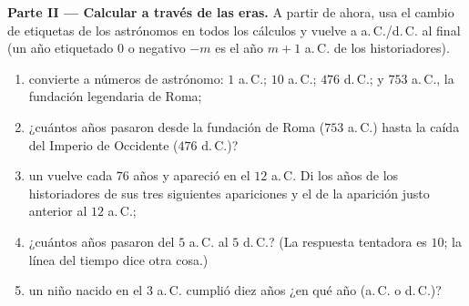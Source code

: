 \begin{problem}
\medskip
\noindent\textbf{Parte II --- Calcular a través de las eras.}
A partir de ahora, usa el cambio de etiquetas de los astrónomos en todos los
cálculos y vuelve a a.\,C./d.\,C. al final (un año etiquetado
$0$ o negativo $-m$ es el año $m + 1$ a.\,C. de los historiadores).
\begin{enumerate}[resume]
  \item convierte a números de astrónomo: $1$ a.\,C.; $10$ a.\,C.; $476$
        d.\,C.; y $753$ a.\,C., la fundación legendaria de Roma;
  \item ¿cuántos años pasaron desde la fundación de Roma
        ($753$ a.\,C.) hasta la caída del Imperio de Occidente ($476$ d.\,C.)?
  \item un  vuelve cada $76$ años y apareció en el
        $12$ a.\,C. Di los años de los historiadores de sus tres siguientes
        apariciones y el de la aparición justo anterior al $12$ a.\,C.;
  \item ¿cuántos años pasaron del $5$ a.\,C. al $5$ d.\,C.? (La
        respuesta tentadora es $10$; la línea del tiempo dice otra cosa.)
  \item un niño nacido en el $3$ a.\,C. cumplió diez años ¿en qué
        año (a.\,C. o d.\,C.)?
\end{enumerate}


\end{problem}
